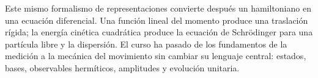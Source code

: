 Este mismo formalismo de representaciones convierte después un hamiltoniano en una ecuación diferencial. Una función lineal del momento produce una traslación rígida; la energía cinética cuadrática produce la ecuación de Schr\"odinger para una partícula libre y la dispersión. El curso ha pasado de los fundamentos de la medición a la mecánica del movimiento sin cambiar su lenguaje central: estados, bases, observables hermíticos, amplitudes y evolución unitaria.
